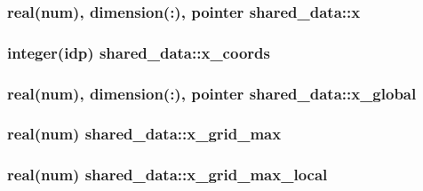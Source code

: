 \subsubsection[{\texorpdfstring{x}{x}}]{\setlength{\rightskip}{0pt plus 5cm}real(num), dimension(\+:), pointer shared\+\_\+data\+::x}\hypertarget{namespaceshared__data_a5a1b9ce71c6bcfbe478783cc7a5e4d7d}{}\label{namespaceshared__data_a5a1b9ce71c6bcfbe478783cc7a5e4d7d}
\subsubsection[{\texorpdfstring{x\+\_\+coords}{x_coords}}]{\setlength{\rightskip}{0pt plus 5cm}integer(idp) shared\+\_\+data\+::x\+\_\+coords}\hypertarget{namespaceshared__data_ad2930b2e73ee090643c12e9cb17176ec}{}\label{namespaceshared__data_ad2930b2e73ee090643c12e9cb17176ec}
\subsubsection[{\texorpdfstring{x\+\_\+global}{x_global}}]{\setlength{\rightskip}{0pt plus 5cm}real(num), dimension(\+:), pointer shared\+\_\+data\+::x\+\_\+global}\hypertarget{namespaceshared__data_a103bc2f0564094768f3a34476b371d3a}{}\label{namespaceshared__data_a103bc2f0564094768f3a34476b371d3a}
\subsubsection[{\texorpdfstring{x\+\_\+grid\+\_\+max}{x_grid_max}}]{\setlength{\rightskip}{0pt plus 5cm}real(num) shared\+\_\+data\+::x\+\_\+grid\+\_\+max}\hypertarget{namespaceshared__data_a109ff2adf267448d4110d7618c16ae54}{}\label{namespaceshared__data_a109ff2adf267448d4110d7618c16ae54}
\subsubsection[{\texorpdfstring{x\+\_\+grid\+\_\+max\+\_\+local}{x_grid_max_local}}]{\setlength{\rightskip}{0pt plus 5cm}real(num) shared\+\_\+data\+::x\+\_\+grid\+\_\+max\+\_\+local}\hypertarget{namespaceshared__data_ad2be7fb0274c89536c91025c7db88b50}{}\label{namespaceshared__data_ad2be7fb0274c89536c91025c7db88b50}
